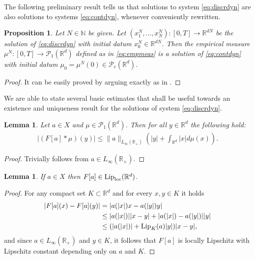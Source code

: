 \documentclass[A4paper,11pt]{article}
\newtheorem{lemma}[theorem]{Lemma}
\newtheorem{proposition}[theorem]{Proposition}
\theoremstyle{definition}
\newcommand{\Lip}{\textup{Lip}}
\newcommand{\loc}{\textup{loc}}
\newcommand{\N}{\mathbb{N}}
\newcommand{\R}{\mathbb{R}}
\newcommand{\PP}{\mathcal{P}_1}
\newcommand{\PC}{\mathcal{P}_c}
\begin{document}
The following preliminary result tells us that solutions to system \eqref{eq:discrdyn} are also solutions to systems \eqref{eq:contdyn}, whenever conveniently rewritten.

\begin{proposition}\label{p-rewritten}
Let $N \in \N$ be given. Let $(x^N_1, \ldots, x^N_N):[0,T] \rightarrow \R^{dN}$ be the solution of \eqref{eq:discrdyn} with initial datum $x^{N}_0 \in \R^{dN}$. Then the empirical measure $\mu^N:[0,T] \rightarrow \PP(\R^d)$ defined as in \eqref{eq:empmeas} is a solution of \eqref{eq:contdyn} with initial datum $\mu_{0}= \mu^N(0) \in \PC(\R^d)$.
\end{proposition}
\begin{proof}
It can be easily proved by arguing exactly as in \cite[Lemma 4.3]{MFOC}.
\end{proof}

 We are able to state several basic estimates that shall be useful towards an existence and uniqueness result for the solutions of system \eqref{eq:discrdyn}.

\begin{lemma}\label{p-estkernel}
Let $a\in X$ and $\mu \in \PP(\R^d)$. Then for all $y \in \R^d$ the following hold:
\begin{align*}
|(F[a] * \mu)(y)| \leq \|a\|_{L_{\infty}(\R_+)}\left( | y | + \int_{\R^d} | x | d\mu(x) \right).
\end{align*}
\end{lemma}
\begin{proof}
Trivially follows from $a \in L_{\infty}(\R_+)$.
\end{proof}

\begin{lemma}\label{p-Floclip}
If $a\in X$ then $F[a] \in \Lip_\loc(\R^d)$.
\end{lemma}
\begin{proof}
For any compact set $K \subset \R^d$ and for every $x,y \in K$ it holds
\begin{align*}
|F[a](x) - F[a](y)| &= |a(|x|)x - a(|y|)y| \\
&\leq |a(|x|)| |x-y| + |a(|x|) - a(|y|)| |y| \\
&\leq (|a(|x|)| + \Lip_K(a) |y|) |x-y|,
\end{align*}
and since $a \in L_{\infty}(\R_+)$ and $y \in K$, it follows that $F[a]$ is locally Lipschitz with Lipschitz constant depending only on $a$ and $K$.
\end{proof}
\end{document}
